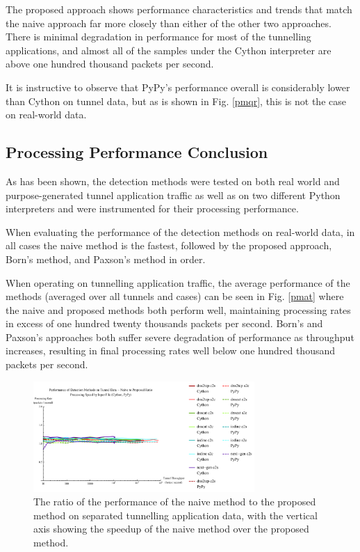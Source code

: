 \documentclass{llncs}
\begin{document}
The proposed approach shows performance characteristics and trends that match
the naive approach far more closely than either of the other two approaches.
There is minimal degradation in performance for most of the tunnelling
applications, and almost all of the samples under the Cython interpreter are
above one hundred thousand packets per second.

It is instructive to observe that PyPy's performance overall is considerably
lower than Cython on tunnel data, but as is shown in Fig. \ref{pmqr}, this is
not the case on real-world data.

\clearpage
\subsection{Processing Performance Conclusion}
As has been shown, the detection methods were tested on both real world and
purpose-generated tunnel application traffic as well as on two different Python
interpreters and were instrumented for their processing performance.

When evaluating the performance of the detection methods on real-world data, in all
cases the naive method is the fastest, followed by the proposed approach, Born's
method, and Paxson's method in order.

When operating on tunnelling application traffic, the average performance of the
methods (averaged over all tunnels and cases) can be seen in Fig. \ref{pmat}
where the naive and proposed methods both perform well, maintaining processing
rates in excess of one hundred twenty thousands packets per second. Born's and
Paxson's approaches both suffer severe degradation of performance as throughput
increases, resulting in final processing rates well below one hundred thousand
packets per second.

\begin{figure} \centering
\includegraphics[width=0.75\textwidth]{../figures/ppia-naive2proposed.pdf}
\caption[Performance Ratio of the Naive Method to the Proposed Method on Tunnel
Data by Python Interpreter]{The ratio of the performance of the naive method to
the proposed method on separated tunnelling application data, with the vertical
axis showing the speedup of the naive method over the proposed method.}
\label{ppia-naive2proposed} \end{figure}
\end{document}
